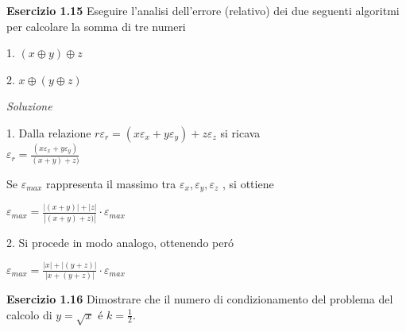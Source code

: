 \documentclass[20pt,a4paper]{book}
\begin{document}
\vspace{10mm}

\textbf{\Large{Esercizio 1.15}}
Eseguire l'analisi dell'errore (relativo) dei due seguenti algoritmi per calcolare la somma
di tre numeri

1. \begin{math}{( x \oplus y)\oplus z}\end{math}

2. \begin{math}{ x \oplus (y\oplus z)}\end{math}

\textit{Soluzione} 

1. Dalla relazione \begin{math}{r\varepsilon_{r}=(x\varepsilon_{x}+y\varepsilon_{y})+z\varepsilon_{z}}\end{math}
si ricava \\   
\begin{math}{\varepsilon_{r}=\frac{(x\varepsilon_{x}+y\varepsilon_{y})}{(x+y)+z)}}\end{math}

Se \begin{math}{\varepsilon_{max}}\end{math} rappresenta il massimo tra \begin{math}{\varepsilon_{x},
\varepsilon_{y},\varepsilon_{z}}\end{math} , si ottiene

\begin{math}{\varepsilon_{max}=\frac{|(x+y)|+|z|}{|(x+y)+z)|}}\cdot\varepsilon_{max}\end{math}

2. Si procede in modo analogo, ottenendo per\'o

\begin{math}{\varepsilon_{max}=\frac{|x|+|(y+z)|}{|x+(y+z)|}}\cdot\varepsilon_{max}\end{math}

\vspace{10mm}

\textbf{\Large{Esercizio 1.16}}
Dimostrare che il numero di condizionamento del problema del calcolo di \begin{math}{y=\sqrt{x}}\end{math} \'e \begin{math}{k=\frac{1}{2}}\end{math}.
\end{document}

